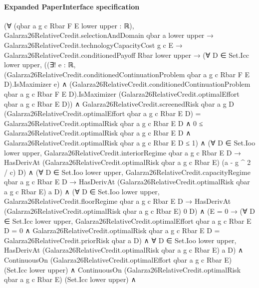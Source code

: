 \documentclass[10pt]{article}
\begin{document}
\paragraph{Expanded PaperInterface specification}
\begin{ReviewVerbatim}
(∀ (qbar a g c Rbar F E lower upper : ℝ),
    Galarza26RelativeCredit.selectionAndDomain qbar a lower upper →
      Galarza26RelativeCredit.technologyCapacityCost g c E →
        Galarza26RelativeCredit.conditionedPayoff Rbar lower upper →
          (∀ D ∈ Set.Icc lower upper,
              ((∃! e : ℝ,
                    (Galarza26RelativeCredit.conditionedContinuationProblem qbar a g c Rbar F E D).IsMaximizer e) ∧
                  (Galarza26RelativeCredit.conditionedContinuationProblem qbar a g c Rbar F E D).IsMaximizer
                    (Galarza26RelativeCredit.optimalEffort qbar a g c Rbar E D)) ∧
                Galarza26RelativeCredit.screenedRisk qbar a g D
                      (Galarza26RelativeCredit.optimalEffort qbar a g c Rbar E D) =
                    Galarza26RelativeCredit.optimalRisk qbar a g c Rbar E D ∧
                  0 ≤ Galarza26RelativeCredit.optimalRisk qbar a g c Rbar E D ∧
                    Galarza26RelativeCredit.optimalRisk qbar a g c Rbar E D ≤ 1) ∧
            (∀ D ∈ Set.Ioo lower upper,
                Galarza26RelativeCredit.interiorRegime qbar a g c Rbar E D →
                  HasDerivAt (Galarza26RelativeCredit.optimalRisk qbar a g c Rbar E) (a - g ^ 2 / c) D) ∧
              (∀ D ∈ Set.Ioo lower upper,
                  Galarza26RelativeCredit.capacityRegime qbar a g c Rbar E D →
                    HasDerivAt (Galarza26RelativeCredit.optimalRisk qbar a g c Rbar E) a D) ∧
                (∀ D ∈ Set.Ioo lower upper,
                    Galarza26RelativeCredit.floorRegime qbar a g c Rbar E D →
                      HasDerivAt (Galarza26RelativeCredit.optimalRisk qbar a g c Rbar E) 0 D) ∧
                  (E = 0 →
                      (∀ D ∈ Set.Icc lower upper,
                          Galarza26RelativeCredit.optimalEffort qbar a g c Rbar E D = 0 ∧
                            Galarza26RelativeCredit.optimalRisk qbar a g c Rbar E D =
                              Galarza26RelativeCredit.priorRisk qbar a D) ∧
                        ∀ D ∈ Set.Ioo lower upper,
                          HasDerivAt (Galarza26RelativeCredit.optimalRisk qbar a g c Rbar E) a D) ∧
                    ContinuousOn (Galarza26RelativeCredit.optimalEffort qbar a g c Rbar E) (Set.Icc lower upper) ∧
                      ContinuousOn (Galarza26RelativeCredit.optimalRisk qbar a g c Rbar E) (Set.Icc lower upper) ∧

\end{ReviewVerbatim}
\end{document}
